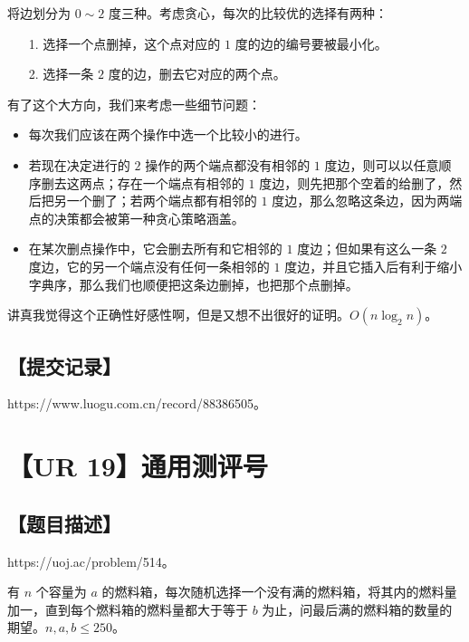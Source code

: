 \documentclass[UTF8,12pt,a4paper]{ctexart}
\begin{document}
	将边划分为 $0\sim 2$ 度三种。考虑贪心，每次的比较优的选择有两种：
	
	\begin{itemize}
		\item [1.] 选择一个点删掉，这个点对应的 $1$ 度的边的编号要被最小化。
		\item [2.] 选择一条 $2$ 度的边，删去它对应的两个点。
	\end{itemize}

	有了这个大方向，我们来考虑一些细节问题：
	
	\begin{itemize}
		\item 每次我们应该在两个操作中选一个比较小的进行。
		\item 若现在决定进行的 $2$ 操作的两个端点都没有相邻的 $1$ 度边，则可以以任意顺序删去这两点；存在一个端点有相邻的 $1$ 度边，则先把那个空着的给删了，然后把另一个删了；若两个端点都有相邻的 $1$ 度边，那么忽略这条边，因为两端点的决策都会被第一种贪心策略涵盖。
		\item 在某次删点操作中，它会删去所有和它相邻的 $1$ 度边；但如果有这么一条 $2$ 度边，它的另一个端点没有任何一条相邻的 $1$ 度边，并且它插入后有利于缩小字典序，那么我们也顺便把这条边删掉，也把那个点删掉。
	\end{itemize}

	讲真我觉得这个正确性好感性啊，但是又想不出很好的证明。$O(n\log_2n)$。
	
	\subsection*{【提交记录】}
	
	https://www.luogu.com.cn/record/88386505。
	
	
	\section*{【UR 19】通用测评号}
	
	\subsection*{【题目描述】}
	
	https://uoj.ac/problem/514。
	
	有 $n$ 个容量为 $a$ 的燃料箱，每次随机选择一个没有满的燃料箱，将其内的燃料量加一，直到每个燃料箱的燃料量都大于等于 $b$ 为止，问最后满的燃料箱的数量的期望。$n,a,b\le 250$。
	
\end{document}
